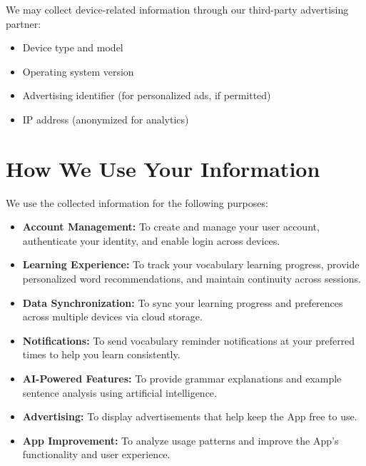 \documentclass[11pt,a4paper]{article}
\begin{document}
We may collect device-related information through our third-party advertising partner:

\begin{itemize}[leftmargin=2em]
    \item Device type and model
    \item Operating system version
    \item Advertising identifier (for personalized ads, if permitted)
    \item IP address (anonymized for analytics)
\end{itemize}

\section{How We Use Your Information}

We use the collected information for the following purposes:

\begin{itemize}[leftmargin=2em]
    \item \textbf{Account Management:} To create and manage your user account, authenticate your identity, and enable login across devices.
    
    \item \textbf{Learning Experience:} To track your vocabulary learning progress, provide personalized word recommendations, and maintain continuity across sessions.
    
    \item \textbf{Data Synchronization:} To sync your learning progress and preferences across multiple devices via cloud storage.
    
    \item \textbf{Notifications:} To send vocabulary reminder notifications at your preferred times to help you learn consistently.
    
    \item \textbf{AI-Powered Features:} To provide grammar explanations and example sentence analysis using artificial intelligence.
    
    \item \textbf{Advertising:} To display advertisements that help keep the App free to use.
    
    \item \textbf{App Improvement:} To analyze usage patterns and improve the App's functionality and user experience.
\end{itemize}
\end{document}
